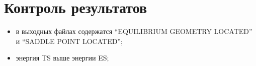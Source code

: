 \section{Контроль результатов}
\begin{itemize}
    \item в выходных файлах содержатся “EQUILIBRIUM GEOMETRY LOCATED” и “SADDLE POINT LOCATED”;
    \item энергия TS выше энергии ES;
\end{itemize}{}